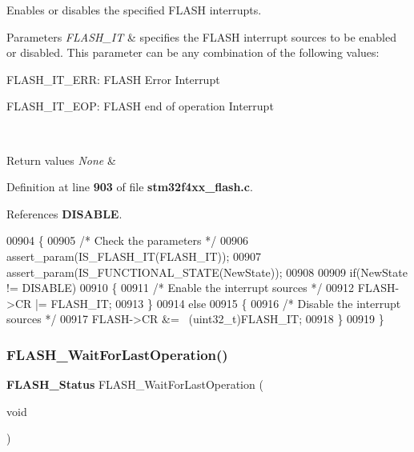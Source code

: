 Enables or disables the specified F\+L\+A\+SH interrupts. 


\begin{DoxyParams}{Parameters}
{\em F\+L\+A\+S\+H\+\_\+\+IT} & specifies the F\+L\+A\+SH interrupt sources to be enabled or disabled. This parameter can be any combination of the following values\+: \begin{DoxyItemize}
\item F\+L\+A\+S\+H\+\_\+\+I\+T\+\_\+\+E\+RR\+: F\+L\+A\+SH Error Interrupt \item F\+L\+A\+S\+H\+\_\+\+I\+T\+\_\+\+E\+OP\+: F\+L\+A\+SH end of operation Interrupt \end{DoxyItemize}
\\
\hline
\end{DoxyParams}

\begin{DoxyRetVals}{Return values}
{\em None} & \\
\hline
\end{DoxyRetVals}


Definition at line \textbf{ 903} of file \textbf{ stm32f4xx\+\_\+flash.\+c}.



References \textbf{ D\+I\+S\+A\+B\+LE}.


\begin{DoxyCode}
00904 \{
00905   \textcolor{comment}{/* Check the parameters */}
00906   assert_param(IS_FLASH_IT(FLASH\_IT)); 
00907   assert_param(IS_FUNCTIONAL_STATE(NewState));
00908 
00909   \textcolor{keywordflow}{if}(NewState != DISABLE)
00910   \{
00911     \textcolor{comment}{/* Enable the interrupt sources */}
00912     FLASH->CR |= FLASH\_IT;
00913   \}
00914   \textcolor{keywordflow}{else}
00915   \{
00916     \textcolor{comment}{/* Disable the interrupt sources */}
00917     FLASH->CR &= ~(uint32\_t)FLASH\_IT;
00918   \}
00919 \}
\end{DoxyCode}
\mbox{\label{group__FLASH__Group4_gaaf8ea3b00c9a5f5eca0df9a795b83f22}} 
\subsubsection{F\+L\+A\+S\+H\+\_\+\+Wait\+For\+Last\+Operation()}
{\footnotesize\ttfamily \textbf{ F\+L\+A\+S\+H\+\_\+\+Status} F\+L\+A\+S\+H\+\_\+\+Wait\+For\+Last\+Operation (\begin{DoxyParamCaption}\item[{void}]{ }\end{DoxyParamCaption})}



